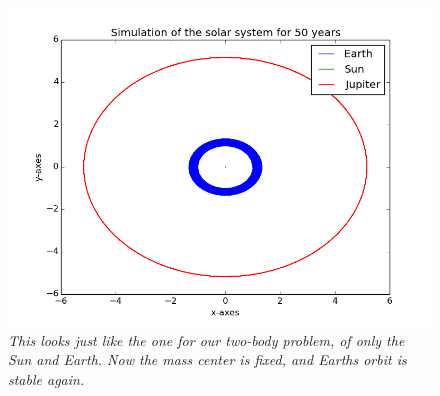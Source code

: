 \documentclass[a4paper,12pt, english]{article}
\begin{document}
\begin{figure}[h!]
  \centering
   	 \includegraphics[scale=0.5]{Mass_center_Jupiter.png}
  \caption{\textit{This looks just like the one for our two-body problem, of only the Sun and Earth. Now the mass center is fixed, and Earths orbit is stable again.}}
\end{figure}
\end{document}
